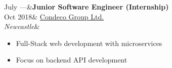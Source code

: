 \documentclass[hidelinks, 12pt, a4paper]{article}
\newcommand{\smitem}[1]{\item {\small {#1}}}
\newenvironment{bullets}{\begin{minipage}[t]{\linewidth}\begin{itemize}[leftmargin=2em,label=-,nosep]}{\end{itemize}\end{minipage}\vspace{2pt}}
\newenvironment{sectionitem}{\vspace{6pt}\noindent\tabularx{\linewidth}{p{70pt}X}}{\endtabularx}
\newcommand{\tech}[1]{
	\tcbox[skin=enhanced,nobeforeafter,colframe=black!20,size=fbox,height=15pt]{\footnotesize#1}
}
\begin{document}
\begin{minipage}{0.58\textwidth}
%	
		
		\begin{sectionitem}
			July ---&\textbf{Junior Software Engineer (Internship)}\\
			Oct 2018& \href{https://www.condecoconnect.com/}{Condeco Group Ltd.}\\
			\emph{Newcastle}& \begin{bullets}
				\smitem{Full-Stack web development with microservices}
				\smitem{Focus on backend API development}
			\end{bullets}\\
		\end{sectionitem}
		
		
		

\end{minipage}
\end{document}
